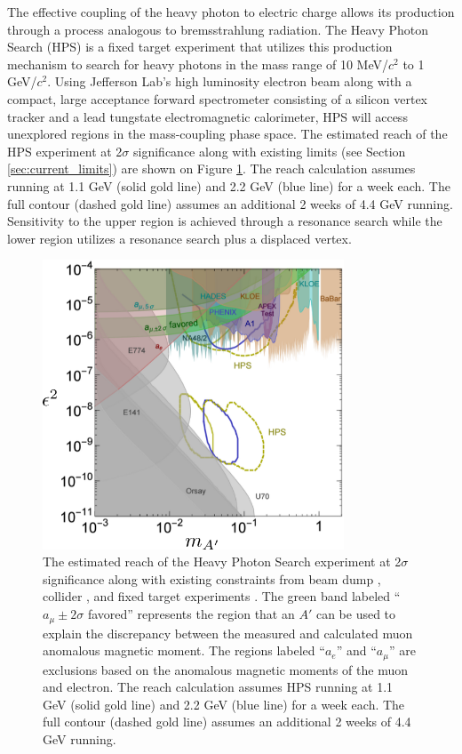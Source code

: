 The effective coupling of the heavy photon to electric charge allows its 
production through a process analogous to bremsstrahlung radiation.  The Heavy
Photon Search (HPS)  is a fixed target experiment that utilizes this production
mechanism to search
for heavy photons in the mass range of 10 MeV/$c^2$ to 1 GeV/$c^2$.  Using 
Jefferson Lab's high luminosity electron beam along with a compact, large
acceptance forward spectrometer consisting of a silicon vertex tracker and a
lead tungstate electromagnetic calorimeter, HPS will access unexplored regions
in the mass-coupling phase space. The estimated reach of the HPS experiment at 
2$\sigma$ significance along with existing limits 
(see Section \ref{sec:current_limits}) are shown on Figure 
\ref{fig:ap_limits}. The reach calculation assumes running at 1.1
GeV (solid gold line) and 2.2 GeV (blue line) for a week each.  The full 
contour (dashed gold line) assumes an additional 2 weeks of 4.4 GeV running. 
Sensitivity to the upper region is achieved through a resonance search while
the lower region utilizes a resonance search plus a displaced vertex.
\begin{figure}[h!t]
    \centering
    \includegraphics[width=0.80\textwidth]{images/ap_current_constraints.png}
    \caption{The estimated reach of the Heavy Photon Search experiment at 
             2$\sigma$ significance along with existing constraints from 
             beam dump  \cite{},
             collider \cite{}, 
             and fixed target experiments \cite{}.  The green band labeled 
             ``$a_{\mu} \pm 2\sigma$ favored'' represents the region that an 
             $A'$ can be used to explain the discrepancy between the measured 
             and calculated muon anomalous magnetic moment.  The regions 
             labeled ``$a_e$'' and ``$a_\mu$'' are exclusions based on the 
             anomalous magnetic moments of the muon and electron.
             The reach calculation assumes HPS running at 1.1 GeV 
             (solid gold line) and 2.2 GeV (blue line) for a week each.  The
             full contour (dashed gold line) assumes an additional 2 weeks of 
             4.4 GeV running.}
    \label{fig:ap_limits}
\end{figure}

